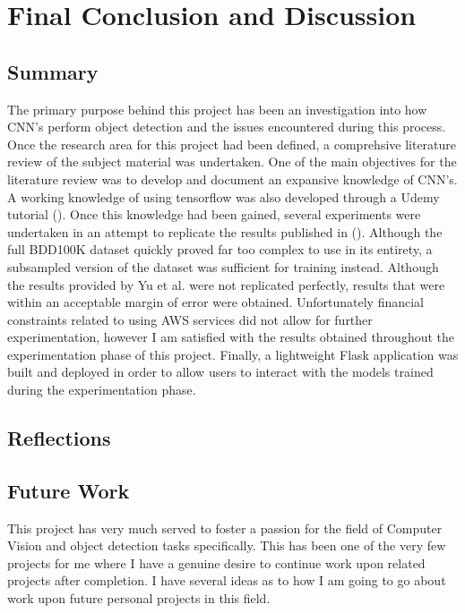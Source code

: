 \documentclass[12pt]{report}
\begin{document}
\newpage
\chapter{Final Conclusion and Discussion}
\section{Summary}
\begin{flushleft}
The primary purpose behind this project has been an investigation into how CNN's perform object detection and the issues encountered during this process. Once the research area for this project had been defined, a comprehsive literature review of the subject material was undertaken. One of the main objectives for the literature review was to develop and document an expansive knowledge of CNN's. A working knowledge of using tensorflow was also developed through a Udemy tutorial (\cite{udemy}). Once this knowledge had been gained, several experiments were undertaken in an attempt to replicate the results published in (\cite{yu2018bdd100k}). Although the full BDD100K dataset quickly proved far too complex to use in its entirety, a subsampled version of the dataset was sufficient for training instead. Although the results provided by Yu et al. were not replicated perfectly, results that were within an acceptable margin of error were obtained. Unfortunately financial constraints related to using AWS services did not allow for further experimentation, however I am satisfied with the results obtained throughout the experimentation phase of this project. Finally, a lightweight Flask application was built and deployed in order to allow users to interact with the models trained during the experimentation phase.
\end{flushleft}

\section{Reflections}

\section{Future Work}
\begin{flushleft}
This project has very much served to foster a passion for the field of Computer Vision and object detection tasks specifically. This has been one of the very few projects for me where I have a genuine desire to continue work upon related projects after completion. I have several ideas as to how I am going to go about work upon future personal projects in this field.
\end{flushleft}
\end{document}
